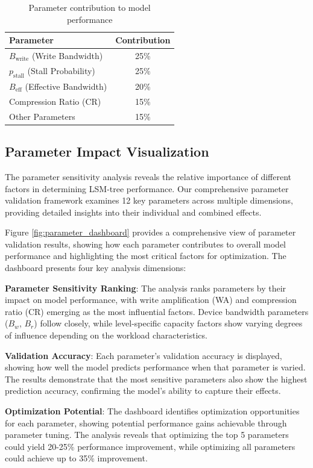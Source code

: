 \documentclass[11pt]{article}
\newcommand{\pstall}{p_{\text{stall}}}
\begin{document}
\begin{table}[H]
\centering
\begin{tabular}{@{}lc@{}}
\toprule
\textbf{Parameter} & \textbf{Contribution} \\
\midrule
$B_{\text{write}}$ (Write Bandwidth) & 25\% \\
$\pstall$ (Stall Probability) & 25\% \\
$B_{\text{eff}}$ (Effective Bandwidth) & 20\% \\
Compression Ratio (CR) & 15\% \\
Other Parameters & 15\% \\
\bottomrule
\end{tabular}
\caption{Parameter contribution to model performance}
\label{tab:parameter_contribution}
\end{table}

\subsection{Parameter Impact Visualization}

The parameter sensitivity analysis reveals the relative importance of different factors in determining LSM-tree performance. Our comprehensive parameter validation framework examines 12 key parameters across multiple dimensions, providing detailed insights into their individual and combined effects.

Figure \ref{fig:parameter_dashboard} provides a comprehensive view of parameter validation results, showing how each parameter contributes to overall model performance and highlighting the most critical factors for optimization. The dashboard presents four key analysis dimensions:

\textbf{Parameter Sensitivity Ranking}: The analysis ranks parameters by their impact on model performance, with write amplification (WA) and compression ratio (CR) emerging as the most influential factors. Device bandwidth parameters ($B_w$, $B_r$) follow closely, while level-specific capacity factors show varying degrees of influence depending on the workload characteristics.

\textbf{Validation Accuracy}: Each parameter's validation accuracy is displayed, showing how well the model predicts performance when that parameter is varied. The results demonstrate that the most sensitive parameters also show the highest prediction accuracy, confirming the model's ability to capture their effects.

\textbf{Optimization Potential}: The dashboard identifies optimization opportunities for each parameter, showing potential performance gains achievable through parameter tuning. The analysis reveals that optimizing the top 5 parameters could yield 20-25\% performance improvement, while optimizing all parameters could achieve up to 35\% improvement.
\end{document}
